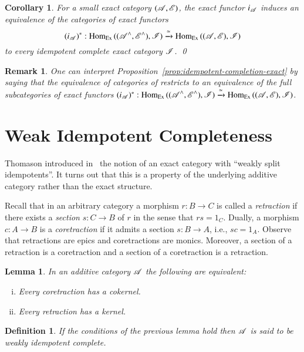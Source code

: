 \documentclass[1p]{elsarticle}
\theoremstyle{mythm}
\newtheorem{Lem}[Thm]{Lemma}
\newtheorem{Cor}[Thm]{Corollary}
\theoremstyle{mydef}
\newtheorem{Rem}[Thm]{Remark}
\newtheorem{Def}[Thm]{Definition}
\begin{document}
\begin{Cor}
  For a small exact category $(\operatorname{\mathscr{A}}, \operatorname{\mathscr{E}})$, the exact functor
  $i_{\operatorname{\mathscr{A}}}$ induces an equivalence of the
  categories of exact functors
  \[
  (i_{\operatorname{\mathscr{A}}})^{\ast}: \operatorname{Hom}_{\operatorname{Ex}}{((\operatorname{\mathscr{A}}^{\wedge}, \operatorname{\mathscr{E}}^{\wedge}),
    \operatorname{\mathscr{I}})} \xrightarrow{\simeq} \operatorname{Hom}_{\operatorname{Ex}}{((\operatorname{\mathscr{A}},\operatorname{\mathscr{E}}), \operatorname{\mathscr{I}})}
  \]
  to every idempotent complete exact category $\operatorname{\mathscr{I}}$. \qed
\end{Cor}
\begin{Rem}
  One can interpret Proposition~\ref{prop:idempotent-completion-exact}
  by saying that the equivalence of categories of
  restricts to an equivalence of
  the full subcategories of exact functors
  $(i_{\operatorname{\mathscr{A}}})^{\ast}: \operatorname{Hom}_{\operatorname{Ex}}{((\operatorname{\mathscr{A}}^{\wedge}, \operatorname{\mathscr{E}}^{\wedge}), \operatorname{\mathscr{I}})} 
  \xrightarrow{\simeq} \operatorname{Hom}_{\operatorname{Ex}}{((\operatorname{\mathscr{A}},\operatorname{\mathscr{E}}), \operatorname{\mathscr{I}})}$.
\end{Rem}
\fi
\section{Weak Idempotent Completeness}
\label{sec:weak-idempotent-compl}

Thomason introduced in~\cite[A.5.1]{MR1106918} the notion of an exact
category with ``weakly split idempotents''.
It turns out that this is a property of the underlying additive
category rather than the exact structure.

Recall that in an arbitrary category a morphism $r: B \to C$ is called
a \emph{retraction} if there exists a \emph{section} $s: C \to B$ of
$r$ in the sense that $rs = 1_{C}$. 
Dually, a morphism $c: A \to B$ is a
\emph{coretraction} if it admits a section $s: B \to A$, i.e.,
$sc = 1_{A}$. Observe that retractions are epics and coretractions
are monics. Moreover, a section of a retraction is a coretraction and
a section of a coretraction is a retraction.

\begin{Lem}
  \label{lem:weakly-idempotent-complete}
  In an additive category $\operatorname{\mathscr{A}}$ the following are equivalent:
  \begin{enumerate}[(i)]
    \item
      Every coretraction has a cokernel.
    \item
      Every retraction has a kernel.
  \end{enumerate}
\end{Lem}

\begin{Def}
  \label{def:weakly-idempotent-complete}
  If the conditions of the previous lemma hold then $\operatorname{\mathscr{A}}$ is said to
  be \emph{weakly idempotent complete}.
\end{Def}
\end{document}
